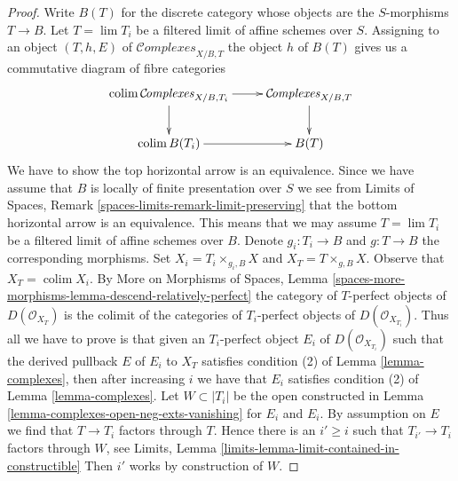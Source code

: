 \documentclass{stacks-project}
\theoremstyle{plain}
\theoremstyle{definition}
\theoremstyle{remark}
\numberwithin{equation}{subsection}
\def\lim{\mathop{\mathrm{lim}}\nolimits}
\def\colim{\mathop{\mathrm{colim}}\nolimits}
\def\Complexesstack{\mathcal{C}\!\mathit{omplexes}}
\begin{document}
\begin{proof}
Write $B(T)$ for the discrete category whose
objects are the $S$-morphisms $T \to B$. Let $T = \lim T_i$ be a filtered
limit of affine schemes over $S$. Assigning to an object
$(T, h, E)$ of $\Complexesstack_{X/B, T}$ the object $h$
of $B(T)$ gives us a commutative diagram of fibre categories
$$
\xymatrix{
\colim \Complexesstack_{X/B, T_i} \ar[r] \ar[d] &
\Complexesstack_{X/B, T} \ar[d] \\
\colim B(T_i) \ar[r] & B(T)
}
$$
We have to show the top horizontal arrow is an equivalence. Since
we have assume that $B$ is locally of finite presentation over $S$
we see from
Limits of Spaces, Remark \ref{spaces-limits-remark-limit-preserving}
that the bottom horizontal arrow is an equivalence. This means that
we may assume $T = \lim T_i$ be a filtered limit of affine schemes over
$B$. Denote $g_i : T_i \to B$ and $g : T \to B$ the corresponding
morphisms. Set $X_i = T_i \times_{g_i, B} X$ and $X_T = T \times_{g, B} X$.
Observe that $X_T = \colim X_i$.
By More on Morphisms of Spaces, Lemma
\ref{spaces-more-morphisms-lemma-descend-relatively-perfect}
the category of $T$-perfect objects of $D(\mathcal{O}_{X_T})$
is the colimit of the categories of $T_i$-perfect objects
of $D(\mathcal{O}_{X_{T_i}})$.
Thus all we have to prove is that given an $T_i$-perfect object
$E_i$ of $D(\mathcal{O}_{X_{T_i}})$ such that
the derived pullback $E$ of $E_i$ to $X_T$ satisfies
condition (2) of Lemma \ref{lemma-complexes},
then after increasing $i$ we have that
$E_i$ satisfies
condition (2) of Lemma \ref{lemma-complexes}.
Let $W \subset |T_i|$ be the open constructed
in Lemma \ref{lemma-complexes-open-neg-exts-vanishing}
for $E_i$ and $E_i$. By assumption on $E$ we find
that $T \to T_i$ factors through $T$.
Hence there is an $i' \geq i$
such that $T_{i'} \to T_i$ factors through $W$, see
Limits, Lemma \ref{limits-lemma-limit-contained-in-constructible}
Then $i'$ works by construction of $W$.
\end{proof}
\end{document}
